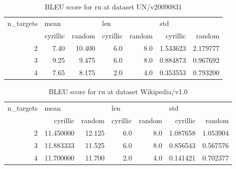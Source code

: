 \begin{table}[h]
\begin{tabular}{rrrrrrr}
\toprule
n\_targets & \multicolumn{2}{l}{mean} & \multicolumn{2}{l}{len} & \multicolumn{2}{l}{std} \\
          & cyrillic &  random & cyrillic & random &  cyrillic &    random \\
\midrule
        2 &     7.40 &  10.400 &      6.0 &    8.0 &  1.533623 &  2.179777 \\
        3 &     9.25 &   9.475 &      6.0 &    8.0 &  0.884873 &  0.967692 \\
        4 &     7.65 &   8.175 &      2.0 &    4.0 &  0.353553 &  0.793200 \\
\bottomrule
\end{tabular}

\caption{BLEU score for  ru at dataset UN/v20090831 }
\label{ table:ru/UN/v20090831 }
\end{table}

\begin{table}[h]
\begin{tabular}{rrrrrrr}
\toprule
n\_targets & \multicolumn{2}{l}{mean} & \multicolumn{2}{l}{len} & \multicolumn{2}{l}{std} \\
          &   cyrillic &  random & cyrillic & random &  cyrillic &    random \\
\midrule
        2 &  11.450000 &  12.125 &      6.0 &    8.0 &  1.087658 &  1.053904 \\
        3 &  11.883333 &  11.525 &      6.0 &    8.0 &  0.856543 &  0.567576 \\
        4 &  11.700000 &  11.700 &      2.0 &    4.0 &  0.141421 &  0.702377 \\
\bottomrule
\end{tabular}

\caption{BLEU score for  ru at dataset Wikipedia/v1.0 }
\label{ table:ru/Wikipedia/v1.0 }
\end{table}


